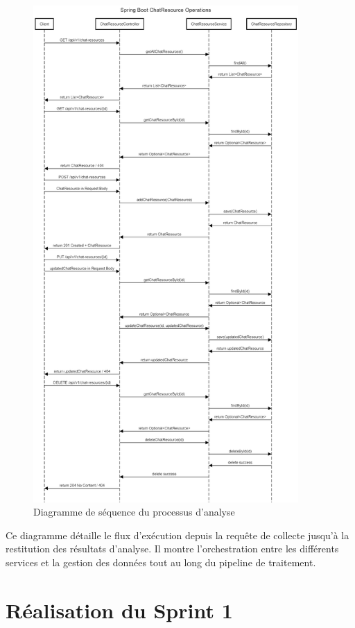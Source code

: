 \begin{figure}[H]
\centering
\includegraphics[width=0.9\textwidth]{assets/images/chat-res-seq.png}
\caption{Diagramme de séquence du processus d'analyse}
\label{fig:sprint1-sequence}
\end{figure}

Ce diagramme détaille le flux d'exécution depuis la requête de collecte jusqu'à la restitution des résultats d'analyse. Il montre l'orchestration entre les différents services et la gestion des données tout au long du pipeline de traitement.

\section{Réalisation du Sprint 1}

